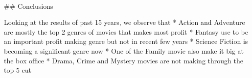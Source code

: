 \documentclass[11pt]{article}
\begin{document}
    \begin{center}
    \end{center}
    { \hspace*{\fill} \\}
    
     \#\# Conclusions

Looking at the results of past 15 years, we observe that * Action and
Adventure are mostly the top 2 genres of movies that makes most profit *
Fantasy use to be an important profit making genre but not in recent few
years * Science Fiction is becoming a significant genre now * One of the
Family movie also make it big at the box office * Drama, Crime and
Mystery movies are not making through the top 5 cut


    
    
    
    
\end{document}
